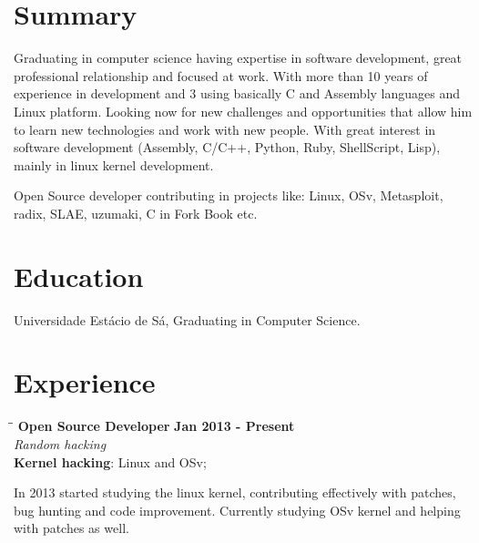 \documentclass[margin]{res}
\begin{document}

\address{Juazeiro do Norte, Brazil \\ \href{mailto:geyslan@gmail.com}{geyslan@gmail.com} \\ Phone: 55 88 9617 0441 \\ Postal Code: 63034-100 }


\begin{resume}

\section{Summary}  Graduating in computer science having expertise in software development, great professional relationship
                        and focused at work. With more than 10 years of experience in development and 3 using basically C and
                        Assembly languages and Linux platform. Looking now for new challenges and opportunities that allow him to learn
                        new technologies and work with new people. With great interest in software development (Assembly, C/C++, Python,
                        Ruby, ShellScript, Lisp), mainly in linux kernel development.

                        Open Source developer contributing in projects like: Linux, OSv, Metasploit, radix, SLAE, uzumaki,
                        C in Fork Book etc.

\section{Education}	Universidade Estácio de Sá, Graduating in Computer Science.

\section{Experience}

\vspace{-0.1in}
   \begin{tabbing}
   \hspace{2.3in}\= \hspace{1.7in}\= \kill %
    \textbf{Open Source Developer}    \>\>\textbf{Jan 2013 - Present}\\
    \textit{Random hacking}\\
    \textbf{Kernel hacking}: Linux and OSv;
   \end{tabbing}\vspace{-20pt}      %
    \vspace{2mm}
    In 2013 started studying the linux kernel, contributing effectively with patches, bug hunting and code improvement.
    Currently studying OSv kernel and helping with patches as well.


\end{resume}
\end{document}
